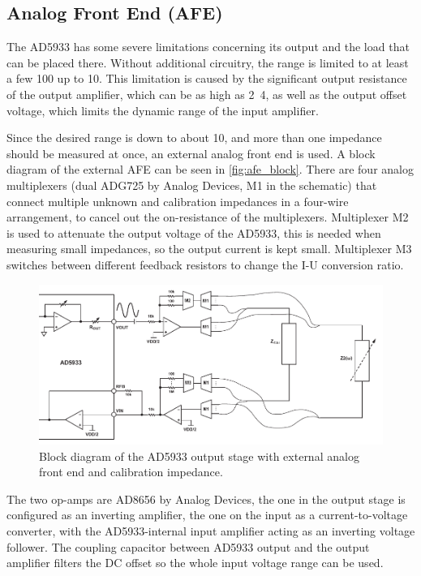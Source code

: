 \subsection{Analog Front End (AFE)}

The AD5933 has some severe limitations concerning its output and the load that can be placed there. Without additional
circuitry, the range is limited to at least a few \unit{100}{\kilo\ohm} up to \unit{10}{\mega\ohm}.
This limitation is caused by the significant output resistance of the output amplifier, which can be as high as
\unit{2.4}{\kilo\ohm}, as well as the output offset voltage, which limits the dynamic range of the input amplifier.

Since the desired range is down to about \unit{10}{\ohm}, and more than one impedance should be measured at once,
an external analog front end is used.
A block diagram of the external AFE can be seen in \autoref{fig:afe_block}.
There are four analog multiplexers (dual ADG725 by Analog Devices, M1 in the schematic) that connect multiple unknown
and calibration impedances in a four-wire arrangement, to cancel out the on-resistance of the multiplexers.
Multiplexer M2 is used to attenuate the output voltage of the AD5933, this is needed when measuring small impedances,
so the output current is kept small.
Multiplexer M3 switches between different feedback resistors to change the I-U conversion ratio.

\begin{figure}[hpb]
  \centering
    \includegraphics[width=\textwidth]{bilder/afe_block.pdf}
  \caption{Block diagram of the AD5933 output stage with external analog front end and calibration impedance.}
  \label{fig:afe_block}
\end{figure}

The two op-amps are AD8656 by Analog Devices, the one in the output stage is configured as an inverting amplifier,
the one on the input as a current-to-voltage converter, with the AD5933-internal input amplifier acting as an inverting
voltage follower. The coupling capacitor between AD5933 output and the output amplifier filters the DC offset so the
whole input voltage range can be used.

